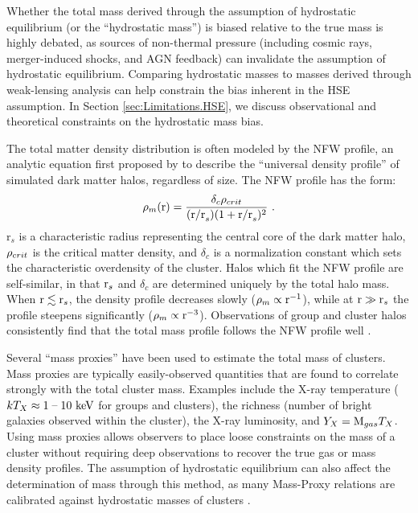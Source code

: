 Whether the total mass derived through the assumption of hydrostatic
equilibrium (or the ``hydrostatic mass'') is biased relative to the
true mass is highly debated, as sources of non-thermal pressure
(including cosmic rays, merger-induced shocks, and AGN feedback) can
invalidate the assumption of hydrostatic equilibrium. Comparing
hydrostatic masses to masses derived through weak-lensing analysis can
help constrain the bias inherent in the HSE assumption. In Section
\ref{sec:Limitations.HSE}, we discuss observational and theoretical
constraints on the hydrostatic mass bias.

The total matter density distribution is often modeled by the NFW
profile, an analytic equation first proposed by \citet{Navarro1996}
to describe the ``universal density profile'' of simulated dark matter
halos, regardless of size. The NFW profile has the form:
\begin{equation}
\rho_m(\textrm{r}) = \frac{\delta_c\rho_{crit}}{(\textrm{r/r}_s)(1 + \textrm{r/r}_s)^2}~.\nonumber
\end{equation}
r$_s$ is a characteristic radius representing the central core of the
dark matter halo, $\rho_{crit}$ is the critical matter density, and
$\delta_c$ is a normalization constant which sets the characteristic
overdensity of the cluster. Halos which fit the NFW profile are
self-similar, in that $\textrm{r}_s$ and $\delta_c$ are determined
uniquely by the total halo mass. When $\textrm{r} \lesssim \textrm{r}_s$, the
density profile decreases slowly ($\rho_m \propto \textrm{r}^{-1}$),
while at $\textrm{r} \gg \textrm{r}_s$ the profile steepens significantly ($\rho_m
\propto \textrm{r}^{-3}$). Observations of group and cluster halos
consistently find that the total mass profile follows the NFW profile
well .

Several ``mass proxies'' have been used to estimate the total mass of
clusters. Mass proxies are typically easily-observed quantities that
are found to correlate strongly with the total cluster mass. Examples
include the X-ray temperature ($kT_X\approx1\;\textrm{--}\;10~\textrm{keV}{}$ for groups
and clusters), the richness (number of bright galaxies observed within
the cluster), the X-ray luminosity, and $Y_X = \textrm{M}_{gas}T_X$. Using
mass proxies allows observers to place loose constraints on the mass
of a cluster without requiring deep observations to recover the true
gas or mass density profiles. The assumption of hydrostatic
equilibrium can also affect the determination of mass through this
method, as many Mass-Proxy relations are calibrated against
hydrostatic masses of clusters .

